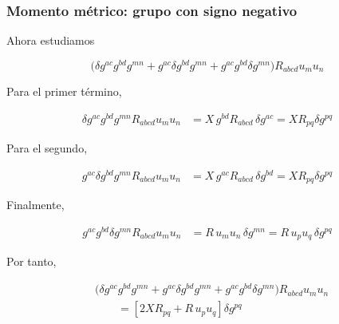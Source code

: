 \documentclass{beamer}
\begin{document}
\begin{frame}[label=nav-frame-103]
\frametitle{Momento métrico: grupo con signo negativo}
\scriptsize

Ahora estudiamos

\[
\Big(
\delta g^{ac}g^{bd}g^{mn}
+
g^{ac}\delta g^{bd}g^{mn}
+
g^{ac}g^{bd}\delta g^{mn}
\Big)
R_{abcd}u_m u_n
\]


Para el primer término,

\begin{align*}
\delta g^{ac}g^{bd}g^{mn}
R_{abcd}u_m u_n
&=
X\,g^{bd}R_{abcd}\,\delta g^{ac}=
X R_{pq}\delta g^{pq}
\end{align*}

Para el segundo,

\begin{align*}
g^{ac}\delta g^{bd}g^{mn}
R_{abcd}u_m u_n
&=
X\,g^{ac}R_{abcd}\,\delta g^{bd}=
X R_{pq}\delta g^{pq}
\end{align*}

Finalmente,

\begin{align*}
g^{ac}g^{bd}\delta g^{mn}
R_{abcd}u_m u_n
&=
R\,u_m u_n\,\delta g^{mn}
=
R\,u_pu_q\,\delta g^{pq}
\end{align*}


Por tanto,

\begin{equation}
\boxed{
\begin{aligned}
&
\Big(
\delta g^{ac}g^{bd}g^{mn}
+
g^{ac}\delta g^{bd}g^{mn}
+
g^{ac}g^{bd}\delta g^{mn}
\Big)
R_{abcd}u_m u_n
\\
&\qquad=
\left[
2X R_{pq}
+
R\,u_pu_q
\right]\delta g^{pq}
\end{aligned}
}
\label{eq:Pbeta-grupo-negativo}
\end{equation}

\end{frame}
\end{document}
